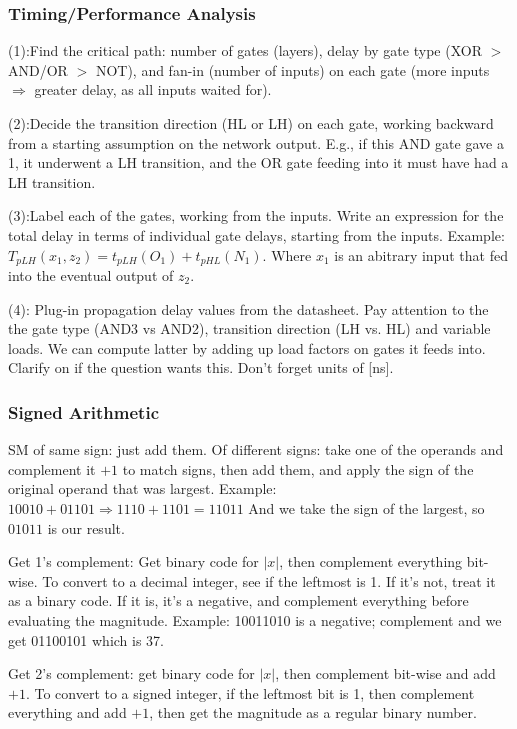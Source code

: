 \documentclass[10pt,letterpaper,twocolumn]{article}
\begin{document}
\subsubsection{Timing/Performance Analysis} 

(1):Find the critical path: number of gates (layers), 
delay by gate type (XOR $ > $ AND/OR $ > $ NOT), 
and fan-in (number of inputs) on each gate (more
inputs $ \Rightarrow $ greater delay, as all inputs 
waited for). 

(2):Decide the transition direction (HL or LH) on each
gate, working backward from a starting assumption on
the network output. E.g., if this AND gate gave a 1, 
it underwent a LH transition, and the OR gate feeding 
into it must have had a LH transition.

(3):Label each of the gates, working from the
inputs. Write an expression for the 
total delay in terms of individual gate delays, 
starting from the inputs. 
Example: 
$ T_{pLH}(x_1, z_2) = t_{pLH}(O_1) + t_{pHL}(N_1) $. 
Where $ x_1 $ is an abitrary input that fed 
into the eventual output of $ z_2 $. 

(4): Plug-in propagation delay values from 
the datasheet. Pay attention to the the gate type 
(AND3 vs AND2), transition direction (LH vs. HL) 
and variable loads. We can compute latter by adding 
up load factors on gates it feeds into. 
Clarify on if the question wants this. 
Don't forget units of [ns].


\subsubsection{Signed Arithmetic}

SM of same sign: just add them. 
Of different signs: take one of
the operands and complement it $ + 1 $ to match
signs, then add them, and apply the sign of the 
original operand that was largest. Example: 
$ 10010 + 01101 \Rightarrow 1110 + 1101 = 1 1011 $
And we take the sign of the largest, so $ 01011 $
is our result. 

Get 1's complement: 
Get binary code for $ |x| $, then complement
everything bit-wise. To convert to a decimal 
integer, see if the leftmost is
1. If it's not, treat it as a binary code. 
If it is, it's a negative, and complement
everything before evaluating the magnitude. 
Example: 10011010 is a negative; complement
and we get 01100101 which is 37. 

Get 2's complement: get binary code for $ |x| $, 
then complement bit-wise and add $ +1 $. To convert
to a signed integer, if the leftmost bit is 1, 
then complement everything and add $ +1 $, then 
get the magnitude as a regular binary number. 
\end{document}
